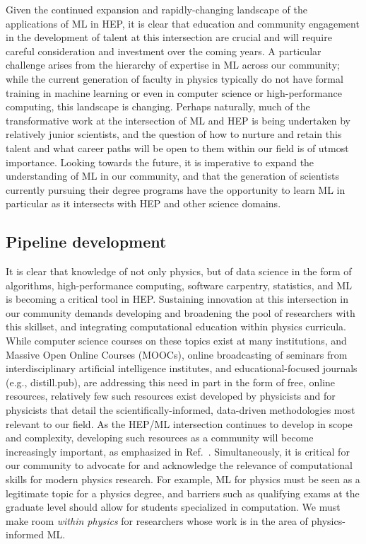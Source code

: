 \documentclass[submission,Phys]{SciPost}
\begin{document}
Given the continued expansion and rapidly-changing landscape of the applications of ML in HEP, it is clear that education and community engagement in the development of talent at this intersection are crucial and will require careful consideration and investment over the coming years. A particular challenge arises from the hierarchy of expertise in ML across our community; while the current generation of faculty in physics typically do not have formal training in machine learning or even in computer science or high-performance computing, this landscape is changing. Perhaps naturally, much of the transformative work at the intersection of ML and HEP is being undertaken by relatively junior scientists, and the question of how to nurture and retain this talent and what career paths will be open to them within our field is of utmost importance. Looking towards the future, it is imperative to expand the understanding of ML in our community, and that the generation of scientists currently pursuing their degree programs have the opportunity to learn ML in particular as it intersects with HEP and other science domains. 


\subsection{Pipeline development}

It is clear that knowledge of not only physics, but of data science in the form of algorithms, high-performance computing, software carpentry, statistics, and ML is becoming a critical tool in HEP. Sustaining innovation at this intersection in our community demands developing and broadening the pool of researchers with this skillset, and integrating computational education within physics curricula. While computer science courses on these topics exist at many institutions, and Massive Open Online Courses (MOOCs), online broadcasting of seminars from interdisciplinary artificial intelligence institutes, and educational-focused journals (e.g., distill.pub), are addressing this need in part in the form of free, online resources, relatively few such resources exist developed by physicists and for physicists that detail the scientifically-informed, data-driven methodologies most relevant to our field. As the HEP/ML intersection continues to develop in scope and complexity, developing such resources as a community will become increasingly important, as emphasized in Ref.~\cite{Benelli:2022sqn}. Simultaneously, it is critical for our community to advocate for and acknowledge the relevance of computational skills for modern physics research. For example, ML for physics must be seen as a legitimate topic for a physics degree, and barriers such as qualifying exams at the graduate level should allow for students specialized in computation. We must make room {\it within physics} for researchers whose work is in the area of physics-informed ML.
\end{document}
